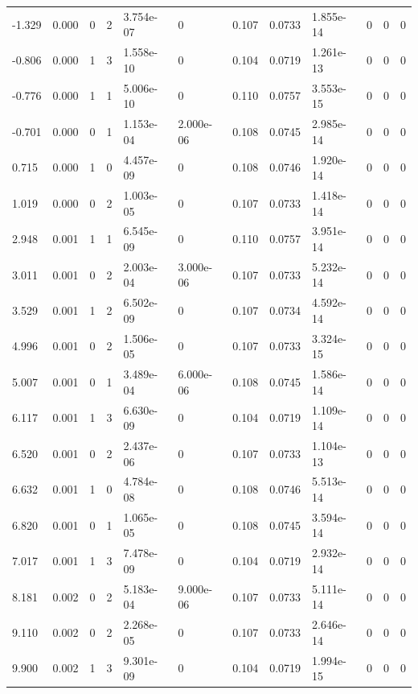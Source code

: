 \documentclass[preview]{standalone}
\begin{document}
{{\begin{tabular}{L{1.2cm}C{1.2cm} C{0.3cm}C{0.5cm} C{1.4cm}C{1.4cm} C{1.4cm}C{1.4cm} C{1.6cm}C{1.6cm} C{1.6cm}C{1.6cm}}
  -1.329  &  0.000  & 0     &  2 &  3.754e-07  & 0  &  0.107&   0.0733& 1.855e-14 & 0   &  0 & 0  \\ 
  -0.806  &  0.000  & 1     &  3 &  1.558e-10  & 0  &  0.104&   0.0719& 1.261e-13 & 0   &  0 & 0  \\ 
  -0.776  &  0.000  & 1     &  1 &  5.006e-10  & 0  &  0.110&   0.0757& 3.553e-15 & 0   &  0 & 0  \\ 
  -0.701  &  0.000  & 0     &  1 &  1.153e-04  & 2.000e-06  &  0.108&   0.0745& 2.985e-14 & 0   &  0 & 0  \\ 
  0.715  &  0.000  & 1     &  0 &  4.457e-09  & 0  &  0.108&   0.0746& 1.920e-14 & 0   &  0 & 0  \\ 
  1.019  &  0.000  & 0     &  2 &  1.003e-05  & 0  &  0.107&   0.0733& 1.418e-14 & 0   &  0 & 0  \\ 
  2.948  &  0.001  & 1     &  1 &  6.545e-09  & 0  &  0.110&   0.0757& 3.951e-14 & 0   &  0 & 0  \\ 
  3.011  &  0.001  & 0     &  2 &  2.003e-04  & 3.000e-06  &  0.107&   0.0733& 5.232e-14 & 0   &  0 & 0  \\ 
  3.529  &  0.001  & 1     &  2 &  6.502e-09  & 0  &  0.107&   0.0734& 4.592e-14 & 0   &  0 & 0  \\ 
  4.996  &  0.001  & 0     &  2 &  1.506e-05  & 0  &  0.107&   0.0733& 3.324e-15 & 0   &  0 & 0  \\ 
  5.007  &  0.001  & 0     &  1 &  3.489e-04  & 6.000e-06  &  0.108&   0.0745& 1.586e-14 & 0   &  0 & 0  \\ 
  6.117  &  0.001  & 1     &  3 &  6.630e-09  & 0  &  0.104&   0.0719& 1.109e-14 & 0   &  0 & 0  \\ 
  6.520  &  0.001  & 0     &  2 &  2.437e-06  & 0  &  0.107&   0.0733& 1.104e-13 & 0   &  0 & 0  \\ 
  6.632  &  0.001  & 1     &  0 &  4.784e-08  & 0  &  0.108&   0.0746& 5.513e-14 & 0   &  0 & 0  \\ 
  6.820  &  0.001  & 0     &  1 &  1.065e-05  & 0  &  0.108&   0.0745& 3.594e-14 & 0   &  0 & 0  \\ 
  7.017  &  0.001  & 1     &  3 &  7.478e-09  & 0  &  0.104&   0.0719& 2.932e-14 & 0   &  0 & 0  \\ 
  8.181  &  0.002  & 0     &  2 &  5.183e-04  & 9.000e-06  &  0.107&   0.0733& 5.111e-14 & 0   &  0 & 0  \\ 
  9.110  &  0.002  & 0     &  2 &  2.268e-05  & 0  &  0.107&   0.0733& 2.646e-14 & 0   &  0 & 0  \\ 
  9.900  &  0.002  & 1     &  3 &  9.301e-09  & 0  &  0.104&   0.0719& 1.994e-15 & 0   &  0 & 0  \\ 

\end{tabular}}}
\end{document}
